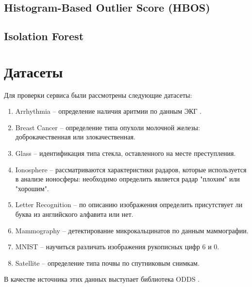 \todo{!}

\subsection{Histogram-Based Outlier Score (HBOS)}

\todo{!}

\subsection{Isolation Forest}

\todo{!}

\clearpage

\section{Датасеты} \label{sec:ch2/sec5}

\noindent Для проверки сервиса были рассмотрены следующие датасеты:
\begin{enumerate}
  \item Arrhythmia -- определение наличия аритмии по данным ЭКГ \cite{guvenir}.
  \item Breast Cancer -- определение типа опухоли молочной железы: доброкачественная или злокачественная.
  \item Glass -- идентификация типа стекла, оставленного на месте преступления.
  \item Ionosphere -- рассматриваются характеристики радаров, которые используется в анализе ионосферы: необходимо определить является радар "плохим" или "хорошим".
  \item Letter Recognition -- по описанию изображения определить присутствует ли буква из английского алфавита или нет.
  \item Mammography -- детектирование микрокальцинатов по данным маммографии.
  \item MNIST -- научиться различать изображения рукописных цифр 6 и 0.
  \item Satellite -- определение типа почвы по спутниковым снимкам.
\end{enumerate}
В качестве источника этих данных выступает библиотека ODDS \cite{odds}.

